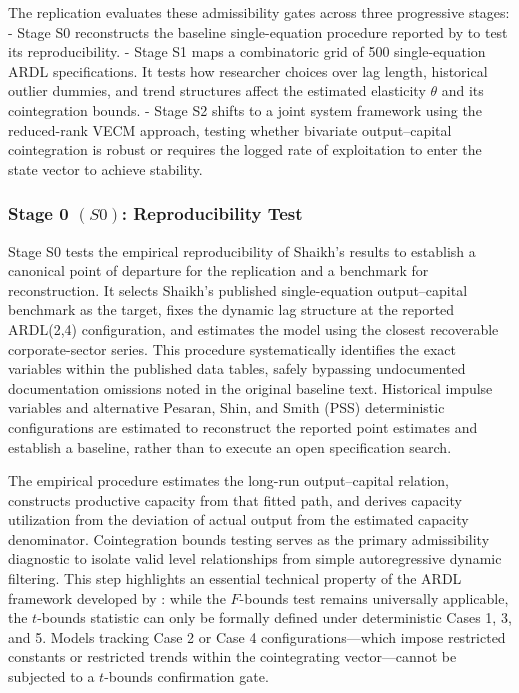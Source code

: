 \documentclass[11pt]{article}
\begin{document}
The replication evaluates these admissibility gates across three progressive stages:
- Stage S0 reconstructs the baseline single-equation procedure reported by \citet{Shaikh2016} to test its reproducibility.
- Stage S1 maps a combinatoric grid of 500 single-equation ARDL specifications. It tests how researcher choices over lag length, historical outlier dummies, and trend structures affect the estimated elasticity $\theta$ and its cointegration bounds.
- Stage S2 shifts to a joint system framework using the \citet{Johansen1991} reduced-rank VECM approach, testing whether bivariate output--capital cointegration is robust or requires the logged rate of exploitation to enter the state vector to achieve stability.

\subsubsection{Stage 0 \texorpdfstring{$(S0)$}{}: Reproducibility Test}
\label{subsec:S0_reproducibility}

Stage S0 tests the empirical reproducibility of Shaikh's results to establish a canonical point of departure for the replication and a benchmark for reconstruction. It selects Shaikh's published single-equation output--capital benchmark as the target, fixes the dynamic lag structure at the reported ARDL(2,4) configuration, and estimates the model using the closest recoverable corporate-sector series. This procedure systematically identifies the exact variables within the published data tables, safely bypassing undocumented documentation omissions noted in the original baseline text. Historical impulse variables and alternative Pesaran, Shin, and Smith (PSS) deterministic configurations are estimated to reconstruct the reported point estimates and establish a baseline, rather than to execute an open specification search.

The empirical procedure estimates the long-run output--capital relation, constructs productive capacity from that fitted path, and derives capacity utilization from the deviation of actual output from the estimated capacity denominator. Cointegration bounds testing serves as the primary admissibility diagnostic to isolate valid level relationships from simple autoregressive dynamic filtering. This step highlights an essential technical property of the ARDL framework developed by \citet{Pesaran2001}: while the $F$-bounds test remains universally applicable, the $t$-bounds statistic can only be formally defined under deterministic Cases 1, 3, and 5. Models tracking Case 2 or Case 4 configurations—which impose restricted constants or restricted trends within the cointegrating vector—cannot be subjected to a $t$-bounds confirmation gate.
\end{document}
